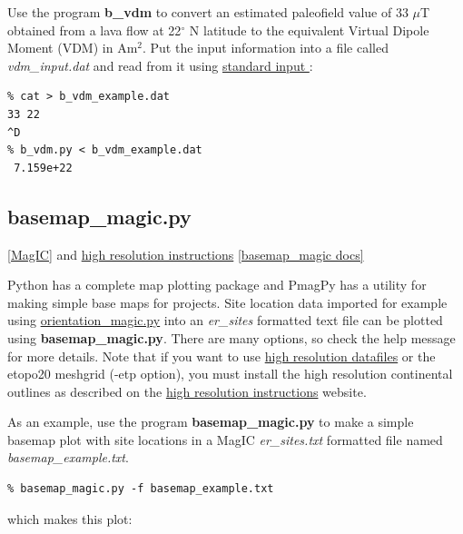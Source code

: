 \documentclass[11pt]{book}
\begin{document}
{{{Use the program {\bf b\_vdm} to convert an estimated paleofield value of 33 $\mu$T obtained from a lava flow at 22$^{\circ}$ N latitude to the equivalent Virtual Dipole Moment (VDM) in Am$^2$.   Put the input information into a file called {\it vdm\_input.dat}  and read from it using  \href{#standard_IO}{standard input }:

\begin{verbatim}
% cat > b_vdm_example.dat
33 22
^D
% b_vdm.py < b_vdm_example.dat
 7.159e+22 
\end{verbatim}

\subsection{basemap\_magic.py}
\label{ex:basemap_magic}
\href{#MagIC}{[MagIC]} and   \href{http://earthref.org/PmagPy/hires.html}{high resolution instructions}
\href{http://earthref.org/PmagPy/pmagpydocs/basemap_magic-module.html}{[basemap\_magic docs]}

Python has a complete map plotting package and PmagPy has a utility for making simple base maps for projects.  Site location data imported for example using \href{#orientation_magic.py}{orientation\_magic.py} into an {\it er\_sites} formatted text file can be plotted using {\bf basemap\_magic.py}.  There are many options, so check the help message for more details.   Note that if you want to use  \href{http://earthref.org/PmagPy/hires.html}{high resolution datafiles}
 or the etopo20 meshgrid (-etp option), you must install the high resolution continental outlines as described on the  \href{http://earthref.org/PmagPy/hires.html}{high resolution instructions} website.

As an example, use the program {\bf basemap\_magic.py} to make  a simple basemap plot with site locations in a MagIC {\it er\_sites.txt}  formatted file named {\it basemap\_example.txt}.  

\begin{verbatim}
% basemap_magic.py -f basemap_example.txt 
\end{verbatim}

\noindent which makes this plot:




}}}
\end{document}
